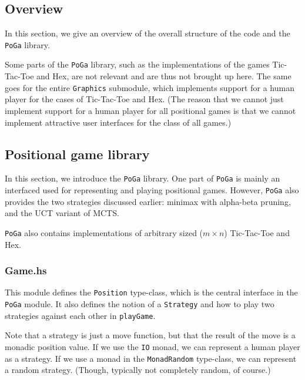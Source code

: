 \subsection {Overview}

In this section, we give an overview of the overall structure of the code and the \texttt{PoGa} library.


Some parts of the \texttt{PoGa} library, such as the implementations of the games Tic-Tac-Toe and Hex, are not relevant and are thus not brought up here.
The same goes for the entire \texttt{Graphics} submodule, which implements support for a human player for the cases of Tic-Tac-Toe and Hex.
(The reason that we cannot just implement support for a human player for all positional games is that we cannot implement attractive user interfaces for the class of all games.)


\subsection {Positional game library}

In this section, we introduce the \texttt{PoGa} library.
One part of \texttt{PoGa} is mainly an interfaced used for representing and playing positional games.
However, \texttt{PoGa} also provides the two strategies discussed earlier: minimax with alpha-beta pruning, and the UCT variant of MCTS.

\texttt{PoGa} also contains implementations of arbitrary sized ($m \times n$) Tic-Tac-Toe and Hex.

\subsubsection {Game.hs}

This module defines the \texttt{Position} type-class, which is the central interface in the \texttt{PoGa} module.
It also defines the notion of a \texttt{Strategy} and how to play two strategies against each other in \texttt{playGame}.

Note that a strategy is just a move function, but that the result of the move is a monadic position value.
If we use the \texttt{IO} monad, we can represent a human player as a strategy. If we use a monad in the \texttt{MonadRandom} type-class, we can represent a random strategy. (Though, typically not completely random, of course.)

